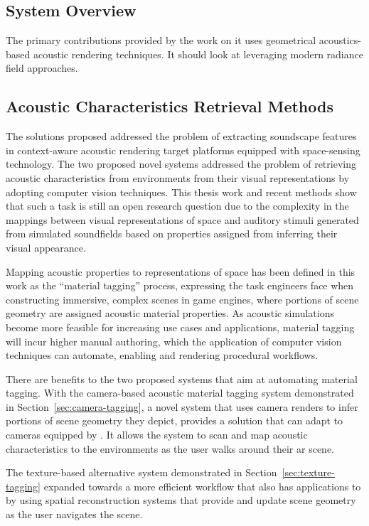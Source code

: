 \subsection{System Overview}
The primary contributions provided by the work on 
it uses geometrical acoustics-based acoustic rendering techniques. It should look at leveraging modern radiance field approaches.

\subsection{Acoustic Characteristics Retrieval Methods}
The solutions proposed addressed the problem of extracting soundscape features in context-aware acoustic rendering target platforms equipped with space-sensing technology. The two proposed novel systems addressed the problem of retrieving acoustic characteristics from environments from their visual representations by adopting computer vision techniques. This thesis work and recent methods show that such a task is still an open research question due to the complexity in the mappings between visual representations of space and auditory stimuli generated from simulated soundfields based on properties assigned from inferring their visual appearance.\par
Mapping acoustic properties to representations of space has been defined in this work as the ``material tagging'' process, expressing the task engineers face when constructing immersive, complex scenes in game engines, where portions of scene geometry are assigned acoustic material properties. As acoustic simulations become more feasible for increasing use cases and applications, material tagging will incur higher manual authoring, which the application of computer vision techniques can automate, enabling and rendering procedural workflows.\par
There are benefits to the two proposed systems that aim at automating material tagging. With the camera-based acoustic material tagging system demonstrated in Section~\ref{sec:camera-tagging}, a novel system that uses camera renders to infer portions of scene geometry they depict, provides a solution that can adapt to cameras equipped by . It allows the system to scan and map acoustic characteristics to the environments as the user walks around their \acrshort{ar} scene.


The texture-based alternative system demonstrated in Section~\ref{sec:texture-tagging} expanded towards a more efficient workflow that also has applications to  by using spatial reconstruction systems that provide and update scene geometry as the user navigates the scene.


